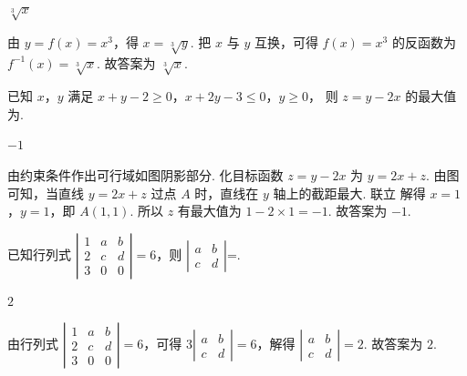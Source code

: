 \begin{answer}
\(\sqrt[3]{x}\)
\end{answer}

\begin{solution}
由 \(y=f(x)=x^3\)，得 \(x=\sqrt[3]{y}\).
把 \(x\) 与 \(y\) 互换，可得 \(f(x)=x^3\) 的反函数为
\(f^{-1}(x)=\sqrt[3]{x}\).
故答案为 \(\sqrt[3]{x}\).
\end{solution}

\begin{problem}
已知 \(x\)，\(y\) 满足 \(x+y-2\ge0\)，\(x+2y-3\le0\)，\(y\ge0\)，
则 \(z=y-2x\) 的最大值为\fillinblank{}.

\end{problem}

\begin{answer}
\(-1\)
\end{answer}

\begin{solution}
由约束条件作出可行域如图阴影部分.
化目标函数 \(z=y-2x\) 为 \(y=2x+z\).
由图可知，当直线 \(y=2x+z\) 过点 \(A\) 时，直线在 \(y\) 轴上的截距最大.
联立
解得 \(x=1\)，\(y=1\)，即 \(A(1,1)\).
所以 \(z\) 有最大值为 \(1-2\times1=-1\).
故答案为 \(-1\).
\end{solution}

\begin{problem}
已知行列式 \(\left|\begin{matrix}
1 & a & b\\
2 & c & d\\
3 & 0 & 0
\end{matrix}\right|=6\)，则 \(\left|\begin{matrix}
a & b\\
c & d
\end{matrix}\right|\)=\fillinblank{}.
\end{problem}

\begin{answer}
\(2\)
\end{answer}

\begin{solution}
由行列式 \(\left|\begin{matrix}
1 & a & b\\
2 & c & d\\
3 & 0 & 0
\end{matrix}\right|=6\)，可得 \(3\left|\begin{matrix}a & b\\ c & d\end{matrix}\right|=6\)，解得 \(\left|\begin{matrix}
a & b\\
c & d
\end{matrix}\right|=2\).
故答案为 \(2\).
\end{solution}

